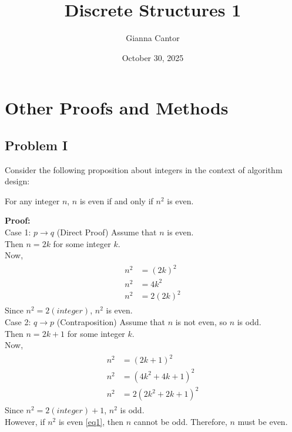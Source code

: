 \documentclass{book}
\title{Discrete Structures 1}
\author{Gianna Cantor}
\date{October 30, 2025}
\begin{document}
\maketitle

\chapter{Other Proofs and Methods}

\section{Problem I}
Consider the following proposition about integers in the context of algorithm design:
\begin{center}
    For any integer $n$, $n$ is even if and only if $n^2$ is even.
\end{center}

\noindent \textbf{Proof:} \\
Case 1: $p \rightarrow q$ (Direct Proof)
Assume that $n$ is even. \\
Then $n = 2k$ for some integer $k$. \\
Now, \begin{multline} \label{eq1}
    \begin{split}
        n^2 &= (2k)^2 \\
        n^2 &= 4k^2 \\
        n^2 &= 2(2k)^2
    \end{split}
    \end{multline}
Since $n^2 = 2(integer)$, $n^2$ is even. \\

Case 2: $q \rightarrow p$ (Contraposition)
Assume that $n$ is not even, so $n$ is odd. \\
Then $n = 2k+1$ for some integer $k$. \\
Now, \begin{multline} \label{eq2}
    \begin{split}
        n^2 &= (2k + 1)^2 \\
        n^2 &= (4k^2 + 4k + 1)^2 \\
        n^2 &= 2(2k^2 + 2k + 1)^2
    \end{split}
    \end{multline}
Since $n^2 = 2(integer) + 1$, $n^2$ is odd. \\
However, if $n^2$ is even \eqref{eq1}, then $n$ cannot be odd.
Therefore, $n$ must be even. \\
\end{document}
